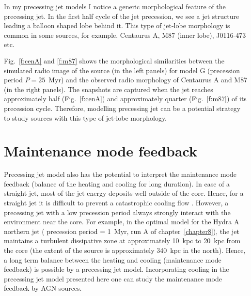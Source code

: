 In my precessing jet models I notice a generic morphological feature of the precessing jet. In the first half cycle of the jet precession, we see a jet structure leading a balloon shaped lobe behind it. This type of jet-lobe morphology is common in some sources, for example, Centaurus A, M87 (inner lobe), J0116-473 etc.

 Fig.~\ref{f:cenA} and \ref{f:m87} shows the morphological similarities between the simulated radio image of the source (in the left panels) for model G (precession period $P = 25$~Myr) and the observed radio morphology of Centaurus A and M87 (in the right panels). The snapshots are captured when the jet reaches approximately half (Fig.~\ref{f:cenA}) and approximately quarter (Fig.~\ref{f:m87}) of its precession cycle. Therefore, modelling precessing jet can be a potential strategy to study sources with this type of jet-lobe morphology.  

\section{Maintenance mode feedback}
Precessing jet model also has the potential to interpret the maintenance mode feedback (balance of the heating and cooling for long duration). In case of a straight jet, most of the jet energy deposits well outside of the core. Hence, for a straight jet it is difficult to prevent a catastrophic cooling flow \citep{vernaleo06}. However, a precessing jet with a low precession period always strongly interact with the environment near the core. For example, in the optimal model for the Hydra A northern jet ( precession period = 1~Myr, run A of chapter~\ref{chapter8}), the jet maintains a turbulent dissipative zone at approximately 10~kpc to 20~kpc from the core (the extent of the source is approximately 340~kpc in the north). Hence, a long term balance between the heating and cooling (maintenance mode feedback) is possible by a precessing jet model. Incorporating cooling in the precessing jet model presented here one can study the maintenance mode feedback by AGN sources. 









